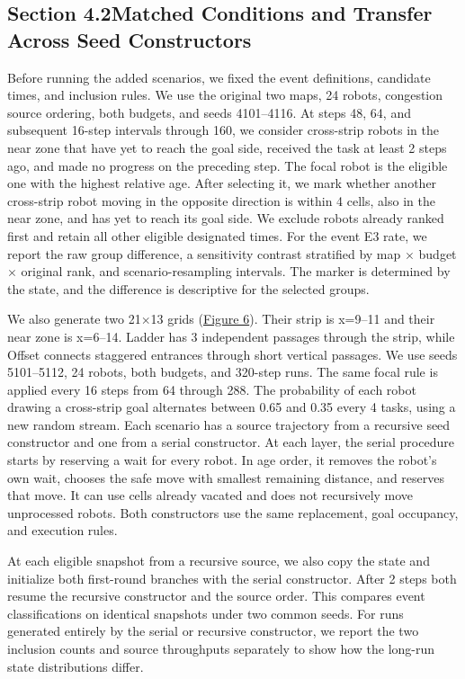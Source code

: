 \documentclass{article}
\begin{document}
\subsection*{Section 4.2\quad Matched Conditions and Transfer Across Seed Constructors}\hypertarget{sup:4.2}{}
Before running the added scenarios, we fixed the event definitions, candidate times, and inclusion rules. We use the original two maps, 24 robots, congestion source ordering, both budgets, and seeds 4101--4116. At steps 48, 64, and subsequent 16-step intervals through 160, we consider cross-strip robots in the near zone that have yet to reach the goal side, received the task at least 2 steps ago, and made no progress on the preceding step. The focal robot is the eligible one with the highest relative age. After selecting it, we mark whether another cross-strip robot moving in the opposite direction is within 4 cells, also in the near zone, and has yet to reach its goal side. We exclude robots already ranked first and retain all other eligible designated times. For the event E3 rate, we report the raw group difference, a sensitivity contrast stratified by map \ensuremath{\times} budget \ensuremath{\times} original rank, and scenario-resampling intervals. The marker is determined by the state, and the difference is descriptive for the selected groups.

We also generate two 21\ensuremath{\times}13 grids (\hyperlink{display:Figure6}{Figure 6}). Their strip is x=9--11 and their near zone is x=6--14. Ladder has 3 independent passages through the strip, while Offset connects staggered entrances through short vertical passages. We use seeds 5101--5112, 24 robots, both budgets, and 320-step runs. The same focal rule is applied every 16 steps from 64 through 288. The probability of each robot drawing a cross-strip goal alternates between 0.65 and 0.35 every 4 tasks, using a new random stream. Each scenario has a source trajectory from a recursive seed constructor and one from a serial constructor. At each layer, the serial procedure starts by reserving a wait for every robot. In age order, it removes the robot's own wait, chooses the safe move with smallest remaining distance, and reserves that move. It can use cells already vacated and does not recursively move unprocessed robots. Both constructors use the same replacement, goal occupancy, and execution rules.

At each eligible snapshot from a recursive source, we also copy the state and initialize both first-round branches with the serial constructor. After 2 steps both resume the recursive constructor and the source order. This compares event classifications on identical snapshots under two common seeds. For runs generated entirely by the serial or recursive constructor, we report the two inclusion counts and source throughputs separately to show how the long-run state distributions differ.
\end{document}

